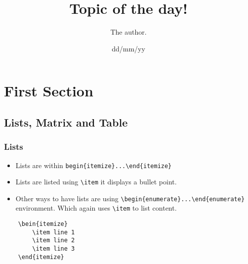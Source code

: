\documentclass{article}
\title{Topic of the day!}
\author{The author.}
\date{dd/mm/yy}
\begin{document}
\maketitle %

\section{First Section}

\subsection{Lists, Matrix and Table}
\subsubsection{Lists}
\begin{itemize}
	\item Lists are within \verb|begin{itemize}...\end{itemize}|
	\item Lists are listed using \verb*|\item| it displays a bullet point.
	\item Other ways to have lists are using \verb*|\begin{enumerate}...\end{enumerate}| environment. Which again uses \verb*|\item| to list content.
\end{itemize}
\begin{verbatim}
	\bein{itemize}
		\item line 1
		\item line 2
		\item line 3
	\end{itemize}
\end{verbatim}
\end{document}
